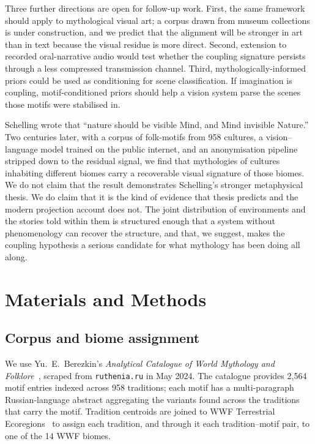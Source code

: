 \documentclass[11pt,a4paper]{article}
\begin{document}
Three further directions are open for follow-up work. First, the same framework
should apply to mythological visual art; a corpus drawn from museum
collections is under construction, and we predict that the alignment
will be stronger in art than in text because the visual residue is
more direct. Second, extension to recorded oral-narrative audio
would test whether the coupling signature persists through a less
compressed transmission channel. Third, mythologically-informed
priors could be used as conditioning for scene classification. If
imagination is coupling, motif-conditioned priors should help a
vision system parse the scenes those motifs were stabilised in.

Schelling wrote that ``nature should be visible Mind, and Mind
invisible Nature.'' Two centuries later, with a corpus of folk-motifs
from 958 cultures, a vision--language model trained on the public
internet, and an anonymisation pipeline stripped down to the residual
signal, we find that mythologies of cultures inhabiting different
biomes carry a recoverable visual signature of those biomes. We do
not claim that the result demonstrates Schelling's stronger
metaphysical thesis. We do claim that it is the kind of evidence that
thesis predicts and the modern projection account does not. The
joint distribution of environments and the stories told within them
is structured enough that a system without phenomenology can recover
the structure, and that, we suggest, makes the coupling hypothesis a
serious candidate for what mythology has been doing all along.

\section*{Materials and Methods}

\subsection*{Corpus and biome assignment}

We use Yu.\ E.\ Berezkin's \emph{Analytical Catalogue of World
Mythology and Folklore}~\citep{berezkin2024catalogue}, scraped from
\texttt{ruthenia.ru} in May 2024. The catalogue provides 2{,}564 motif
entries indexed across 958 traditions; each motif has a
multi-paragraph Russian-language abstract aggregating the variants
found across the traditions that carry the motif. Tradition centroids
are joined to WWF Terrestrial
Ecoregions~\citep{olson2001terrestrial} to assign each tradition, and
through it each tradition--motif pair, to one of the 14 WWF biomes.
\end{document}
